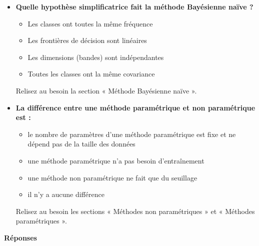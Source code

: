 \documentclass[
  french,
  11pt,
  letterpaper,
  open=any,
  twoside=false,
  french]{scrbook}
\providecommand{\tightlist}{%
  \setlength{\itemsep}{0pt}\setlength{\parskip}{0pt}}
\begin{document}
\begin{itemize}
  \begin{itemize}
  \tightlist
  \item
    n'a aucun effet sur les frontières de décision
  \item
    rend les frontières de décision plus lisses (et le calcul plus long)
  \item
    garantit toujours une meilleure précision
  \item
    réduit le nombre de dimensions
  \end{itemize}

  Relisez au besoin la section « Plus proches voisins ».
\item
  \textbf{Quelle hypothèse simplificatrice fait la méthode Bayésienne
  naïve ?}

  \begin{itemize}
  \tightlist
  \item
    Les classes ont toutes la même fréquence
  \item
    Les frontières de décision sont linéaires
  \item
    Les dimensions (bandes) sont indépendantes
  \item
    Toutes les classes ont la même covariance
  \end{itemize}

  Relisez au besoin la section « Méthode Bayésienne naïve ».
\item
  \textbf{La différence entre une méthode paramétrique et non
  paramétrique est :}

  \begin{itemize}
  \tightlist
  \item
    le nombre de paramètres d'une méthode paramétrique est fixe et ne
    dépend pas de la taille des données
  \item
    une méthode paramétrique n'a pas besoin d'entraînement
  \item
    une méthode non paramétrique ne fait que du seuillage
  \item
    il n'y a aucune différence
  \end{itemize}

  Relisez au besoin les sections « Méthodes non paramétriques » et «
  Méthodes paramétriques ».
\end{itemize}

\textbf{Réponses}
\end{document}
